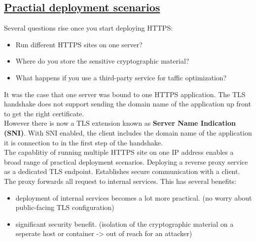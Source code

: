 \documentclass[titlepage]{article}
\begin{document}
    \subsection{\href{https://youtu.be/snIspjMK648}{Practial deployment scenarios}}
    Several questions rise once you start deploying HTTPS:
    \begin{itemize}
        \item Run different HTTPS sites on one server?
        \item Where do you store the sensitive cryptographic material?
        \item What happens if you use a third-party service for taffic optimization?
    \end{itemize}
    It was the case that one server was bound to one HTTPS application. The TLS handshake does not support sending the domain name of the application up front to get the right certificate.\\
    However there is now a TLS extension known as \textbf{Server Name Indication (SNI)}. With SNI enabled, the client includes the domain name of the application it is connection to in the first step of the handshake.\\
    The capablitiy of running multiple HTTPS site on one IP address enables a broad range of practical deployment scenarios. Deploying a reverse proxy service as a dedicated TLS endpoint. Establishes secure communication with a client. The proxy forwards all request to internal services. This has several benefits:
    \begin{itemize}
        \item deployment of internal services becomes a lot more practical. (no worry about public-facing TLS configuration)
        \item significant security benefit. (isolation of the cryptographic material on a seperate host or container -> out of reach for an attacker)
    \end{itemize}
\end{document}
